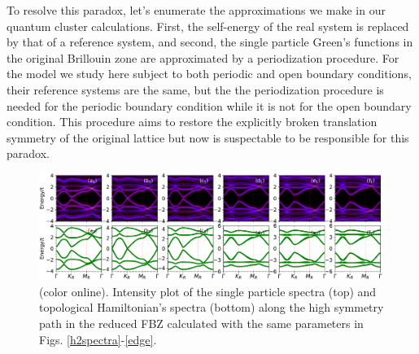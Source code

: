 \documentclass[12pt]{iopart}
\begin{document}
\par To resolve this paradox, let's enumerate the approximations we make in our quantum cluster calculations. First, the self-energy of the real system is replaced by that of a reference system, and second, the single particle Green's functions in the original Brillouin zone are approximated by a periodization procedure. For the model we study here subject to both periodic and open boundary conditions, their reference systems are the same, but the the periodization procedure is needed for the periodic boundary condition while it is not for the open boundary condition. This procedure aims to restore the explicitly broken translation symmetry of the original lattice but now is suspectable to be responsible for this paradox.

\begin{figure}
\centering
\includegraphics[scale=0.45]{h6spectra}
\caption{(color online). Intensity plot of the single particle spectra (top) and topological Hamiltonian's spectra (bottom) along the high symmetry path in the reduced FBZ calculated with the same parameters in Figs. \ref{h2spectra}-\ref{edge}.}\label{h6spectra}
\end{figure}
\end{document}
